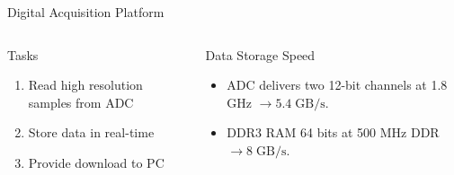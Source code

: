 \documentclass[10pt]{beamer}
\newcommand*{\ClipSep}{0.3cm}%
\begin{document}
\begin{frame}{Digital Acquisition Platform}
  \begin{columns}[T]
    \begin{column}{.5\textwidth}
      \begin{block}{Tasks}
        \begin{enumerate}
        \item Read high resolution samples from ADC
        \item Store data in real-time
        \item Provide download to PC
        \end{enumerate}
      \end{block}
      \vspace{5mm}
    \end{column}
    \begin{column}{.5\textwidth}
      \begin{block}{Data Storage Speed}
        \begin{itemize}
        \item ADC delivers two 12-bit channels at 1.8 GHz
          $\rightarrow 5.4 \;\text{GB}/\text{s}$.
        \item DDR3 RAM 64 bits at 500 MHz DDR $\rightarrow 8 \;\text{GB}/\text{s}$.

\end{itemize}
\end{block}
\end{column}
\end{columns}
\end{frame}
\end{document}
